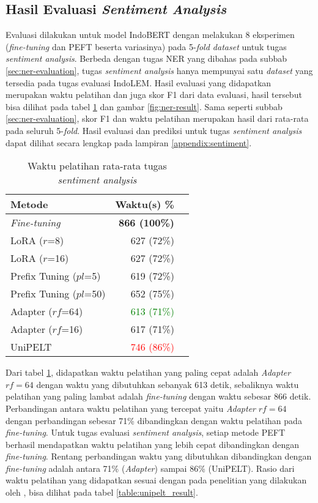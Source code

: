 \subsection{Hasil Evaluasi \textit{Sentiment Analysis}}
\label{sec:sentiment-evaluation}

Evaluasi dilakukan untuk model IndoBERT dengan melakukan 8 eksperimen (\textit{fine-tuning} dan PEFT beserta variasinya) pada 5-\textit{fold dataset} untuk tugas \textit{sentiment analysis}. Berbeda dengan tugas NER yang dibahas pada subbab \ref{sec:ner-evaluation}, tugas \textit{sentiment analysis} hanya mempunyai satu \textit{dataset} yang tersedia pada tugas evaluasi IndoLEM. Hasil evaluasi yang didapatkan merupakan waktu pelatihan dan juga skor F1 dari data evaluasi, hasil tersebut bisa dilihat pada tabel \ref{table:runtime-sentiment} dan gambar \ref{fig:ner-result}. Sama seperti subbab \ref{sec:ner-evaluation}, skor F1 dan waktu pelatihan merupakan hasil dari rata-rata pada seluruh 5-\textit{fold}. Hasil evaluasi dan prediksi untuk tugas \textit{sentiment analysis} dapat dilihat secara lengkap pada lampiran \ref{appendix:sentiment}.

\begin{table}[h]
    \centering
    \caption{Waktu pelatihan rata-rata tugas \textit{sentiment analysis}}
    \label{table:runtime-sentiment}
    \begin{tabular}{l|rr}
        \toprule
        \textbf{Metode} & \textbf{Waktu(s) \%} \\
        \midrule
        \textit{Fine-tuning} & \textbf{866 (100\%)} \\
        LoRA ($r$=8) & 627 (72\%) \\
        LoRA ($r$=16) & 627 (72\%) \\
        Prefix Tuning ($pl$=5) & 619 (72\%) \\
        Prefix Tuning ($pl$=50) & 652 (75\%) \\
        Adapter ($rf$=64) & \textcolor{Green}{613 (71\%)} \\
        Adapter ($rf$=16) & 617 (71\%) \\
        UniPELT & \textcolor{Red}{746 (86\%)} \\
        \bottomrule
    \end{tabular}
\end{table}

Dari tabel \ref{table:runtime-sentiment}, didapatkan waktu pelatihan yang paling cepat adalah \textit{Adapter} $rf=64$ dengan waktu yang dibutuhkan sebanyak 613 detik, sebaliknya waktu pelatihan yang paling lambat adalah \textit{fine-tuning} dengan waktu sebesar 866 detik. Perbandingan antara waktu pelatihan yang tercepat yaitu \textit{Adapter} $rf=64$ dengan perbandingan sebesar 71\% dibandingkan dengan waktu pelatihan pada \textit{fine-tuning}. Untuk tugas evaluasi \textit{sentiment analysis}, setiap metode PEFT berhasil mendapatkan waktu pelatihan yang lebih cepat dibandingkan dengan \textit{fine-tuning}. Rentang perbandingan waktu yang dibutuhkan dibandingkan dengan \textit{fine-tuning} adalah antara 71\% (\textit{Adapter}) sampai 86\% (UniPELT). Rasio dari waktu pelatihan yang didapatkan sesuai dengan pada penelitian yang dilakukan oleh \citeauthor{unipelt}, bisa dilihat pada tabel \ref{table:unipelt_result}.

